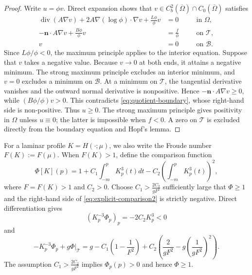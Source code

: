\documentclass[12pt,letterpaper]{amsart}
\numberwithin{equation}{section}
\begin{document}
	\begin{proof}
		Write \(u=\phi v\). {Direct expansion shows that $v\in C_b^2(\overline\Omega)\cap C_0(\overline\Omega)$ satisfies}
		\begin{subequations}\label{eq:quotient-equation}
			\begin{align}
			\operatorname{div}(A\nabla v)
				+2A\nabla(\log\phi)\cdot\nabla v
				+\frac{L\phi}{\phi}v&=0\quad  &&\text{in }\Omega,\label{eq:quotient-interior}\\
				-\mathbf n\cdot A\nabla v+\frac{B\phi}{\phi}v&=\frac{f}{\phi} &&\text{on }\mathcal T,\label{eq:quotient-boundary}\\
				v&=0              &&\text{on }\mathcal B.\label{eq:quotient-bed}
			\end{align}
		\end{subequations}
	{Since $L\phi/\phi<0$, the maximum principle applies to the interior equation. Suppose that $v$ takes a negative value. Because $v\to0$ at both ends, it attains a negative minimum. The strong maximum principle excludes an interior minimum, and $v=0$ excludes a minimum on $\mathcal B$. At a minimum on $\mathcal T$, the tangential derivative vanishes and the outward normal derivative is nonpositive.}  Hence
		\(-\mathbf n\cdot A\nabla v\ge0\), while
		\((B\phi/\phi)v>0\).  This contradicts
		\eqref{eq:quotient-boundary}, whose right-hand side is non-positive.  Thus
		\(u\ge0\).  The strong maximum principle gives positivity in \(\Omega\) unless
		\(u\equiv0\); the latter is impossible when \(f<0\).  A zero on \(\mathcal T\) is
		excluded directly from {the boundary equation and Hopf's lemma}.
	\end{proof}
	 {For a laminar profile $K=H(\cdot;\mu)$, we also write the Froude number $F(K):=F(\mu)$. When $F(K)>1$, define the comparison function}
	\begin{equation}\label{eq:explicit-comparison}
	\Phi[K](p)=1+C_1\int_{-m}^pK_p^3(t)dt-C_2\left(\int_{-m}^pK_p^3(t)\right)^2,
	\end{equation}
	{where $F=F(K)>1$ and $C_2>0$. Choose $C_1>\frac{2C_2}{gF^2}$ sufficiently large that} {$\Phi\geq1$} and {the right-hand side of} \eqref{eq:explicit-comparison2} {is strictly negative. Direct differentiation gives}
	\begin{equation*}
		(K_p^{-3}\Phi_p)_p=-2C_2K_p^3<0
	\end{equation*}
	and
	\begin{equation}\label{eq:explicit-comparison2}
		-K_p^{-3}\Phi_p+g\Phi\bigg|_{\mathcal{T}}=g-C_1\left(1-\frac{1}{F^2}\right)+C_2\left(\frac{2}{gF^2}-g\left(\frac{1}{gF^2}\right)^2\right).
	\end{equation}
	The assumption $C_1>\frac{2 C_2}{gF^2}$ implies $\Phi_p(p)>0$ and hence $\Phi\geq1$.
	
\end{document}
